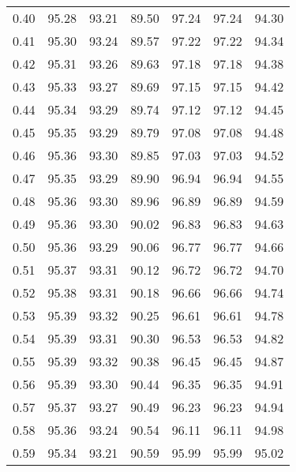 \begin{tabular}{|c|c|c|c|c|c|c|}
      0.40 &     95.28 &     93.21 &      89.50 &   97.24 &      97.24 &         94.30 \\
      0.41 &     95.30 &     93.24 &      89.57 &   97.22 &      97.22 &         94.34 \\
      0.42 &     95.31 &     93.26 &      89.63 &   97.18 &      97.18 &         94.38 \\
      0.43 &     95.33 &     93.27 &      89.69 &   97.15 &      97.15 &         94.42 \\
      0.44 &     95.34 &     93.29 &      89.74 &   97.12 &      97.12 &         94.45 \\
      0.45 &     95.35 &     93.29 &      89.79 &   97.08 &      97.08 &         94.48 \\
      0.46 &     95.36 &     93.30 &      89.85 &   97.03 &      97.03 &         94.52 \\
      0.47 &     95.35 &     93.29 &      89.90 &   96.94 &      96.94 &         94.55 \\
      0.48 &     95.36 &     93.30 &      89.96 &   96.89 &      96.89 &         94.59 \\
      0.49 &     95.36 &     93.30 &      90.02 &   96.83 &      96.83 &         94.63 \\
      0.50 &     95.36 &     93.29 &      90.06 &   96.77 &      96.77 &         94.66 \\
      0.51 &     95.37 &     93.31 &      90.12 &   96.72 &      96.72 &         94.70 \\
      0.52 &     95.38 &     93.31 &      90.18 &   96.66 &      96.66 &         94.74 \\
      0.53 &     95.39 &     93.32 &      90.25 &   96.61 &      96.61 &         94.78 \\
      0.54 &     95.39 &     93.31 &      90.30 &   96.53 &      96.53 &         94.82 \\
      0.55 &     95.39 &     93.32 &      90.38 &   96.45 &      96.45 &         94.87 \\
      0.56 &     95.39 &     93.30 &      90.44 &   96.35 &      96.35 &         94.91 \\
      0.57 &     95.37 &     93.27 &      90.49 &   96.23 &      96.23 &         94.94 \\
      0.58 &     95.36 &     93.24 &      90.54 &   96.11 &      96.11 &         94.98 \\
      0.59 &     95.34 &     93.21 &      90.59 &   95.99 &      95.99 &         95.02 \\

\end{tabular}
